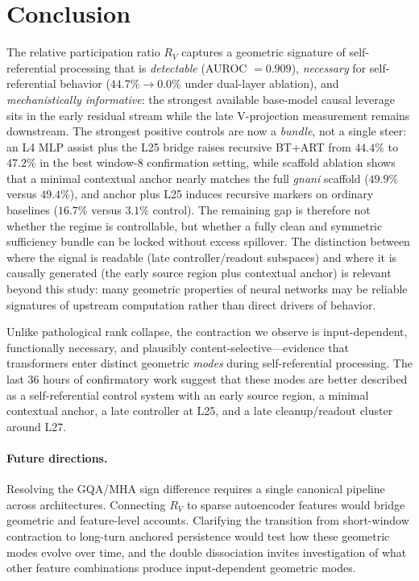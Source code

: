 \documentclass{article}
\newcommand{\RV}{R_V}
\begin{document}
\section{Conclusion}

The relative participation ratio $\RV$ captures a geometric signature of self-referential
processing that is \emph{detectable} (AUROC $= 0.909$),
\emph{necessary} for self-referential behavior ($44.7\% \to 0.0\%$ under dual-layer ablation),
and \emph{mechanistically informative}: the strongest available base-model causal leverage sits in
the early residual stream while the late V-projection measurement remains downstream.
The strongest positive controls are now a \emph{bundle}, not a single steer:
an L4 MLP assist plus the L25 bridge raises recursive BT+ART from $44.4\%$ to $47.2\%$ in the
best window-8 confirmation setting, while scaffold ablation shows that a minimal contextual anchor
nearly matches the full \emph{gnani} scaffold ($49.9\%$ versus $49.4\%$), and
anchor plus L25 induces recursive markers on ordinary baselines
($16.7\%$ versus $3.1\%$ control).
The remaining gap is therefore not whether the regime is controllable, but whether a fully clean
and symmetric sufficiency bundle can be locked without excess spillover.
The distinction between where the signal is readable (late controller/readout subspaces) and where
it is causally generated (the early source region plus contextual anchor) is relevant beyond this
study: many geometric properties of neural networks may be reliable signatures of upstream
computation rather than direct drivers of behavior.

Unlike pathological rank collapse, the contraction we observe is input-dependent, functionally
necessary, and plausibly content-selective---evidence that transformers enter distinct geometric
\emph{modes} during self-referential processing.
The last 36 hours of confirmatory work suggest that these modes are better described as a
self-referential control system with an early source region, a minimal contextual anchor, a late
controller at L25, and a late cleanup/readout cluster around L27.

\paragraph{Future directions.}
Resolving the GQA/MHA sign difference requires a single canonical pipeline across architectures.
Connecting $\RV$ to sparse autoencoder features would bridge geometric and feature-level
accounts.
Clarifying the transition from short-window contraction to long-turn anchored persistence would test
how these geometric modes evolve over time, and the double dissociation invites investigation of
what other feature combinations produce input-dependent geometric modes.
\end{document}
